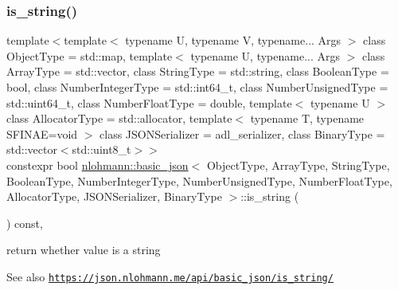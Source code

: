 \subsubsection{\texorpdfstring{is\+\_\+string()}{is\_string()}}
{\footnotesize\ttfamily template$<$template$<$ typename U, typename V, typename... Args $>$ class Object\+Type = std\+::map, template$<$ typename U, typename... Args $>$ class Array\+Type = std\+::vector, class String\+Type  = std\+::string, class Boolean\+Type  = bool, class Number\+Integer\+Type  = std\+::int64\+\_\+t, class Number\+Unsigned\+Type  = std\+::uint64\+\_\+t, class Number\+Float\+Type  = double, template$<$ typename U $>$ class Allocator\+Type = std\+::allocator, template$<$ typename T, typename S\+F\+I\+N\+A\+E=void $>$ class J\+S\+O\+N\+Serializer = adl\+\_\+serializer, class Binary\+Type  = std\+::vector$<$std\+::uint8\+\_\+t$>$$>$ \\
constexpr bool \hyperlink{classnlohmann_1_1basic__json}{nlohmann\+::basic\+\_\+json}$<$ Object\+Type, Array\+Type, String\+Type, Boolean\+Type, Number\+Integer\+Type, Number\+Unsigned\+Type, Number\+Float\+Type, Allocator\+Type, J\+S\+O\+N\+Serializer, Binary\+Type $>$\+::is\+\_\+string (\begin{DoxyParamCaption}{ }\end{DoxyParamCaption}) const\hspace{0.3cm}{\ttfamily [inline]}, {\ttfamily [noexcept]}}



return whether value is a string 

\begin{DoxySeeAlso}{See also}
\href{https://json.nlohmann.me/api/basic_json/is_string/}{\tt https\+://json.\+nlohmann.\+me/api/basic\+\_\+json/is\+\_\+string/} 
\end{DoxySeeAlso}
\mbox{\label{classnlohmann_1_1basic__json_a4e05a7d5deec758f1d830741b68b4249}} 

